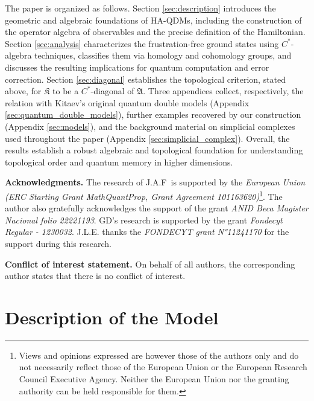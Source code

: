 \documentclass[a4paper,12pt,twoside,reqno]{amsart}
\theoremstyle{plain}
\theoremstyle{definition}
\theoremstyle{remark}
\numberwithin{equation}{section}
\numberwithin{figure}{section}
\numberwithin{table}{section}
\begin{document}
	The paper is organized as follows. Section \ref{sec:description} introduces the geometric and algebraic foundations of HA-QDMs, including the construction of the operator algebra of observables and the precise definition of the Hamiltonian. Section \ref{sec:analysis} characterizes the frustration-free ground states using $C^*$-algebra techniques, classifies them via homology and cohomology groups, and discusses the resulting implications for quantum computation and error correction. Section \ref{sec:diagonal} establishes the topological criterion, stated above, for $\mathfrak{K}$ to be a $C^*$-diagonal of $\mathfrak{A}$. Three appendices collect, respectively, the relation with Kitaev's original quantum double models (Appendix \ref{sec:quantum_double_models}), further examples recovered by our construction (Appendix \ref{sec:models}), and the background material on simplicial complexes used throughout the paper (Appendix \ref{sec:simplicial_complex}). Overall, the results establish a robust algebraic and topological foundation for understanding topological order and quantum memory in higher dimensions.
	
	
	
	\medskip
	
	\noindent
	{\bf Acknowledgments.} The research of J.A.F is supported by the \emph{European Union (ERC Starting Grant MathQuantProp, Grant Agreement 101163620)}\footnote{Views and opinions expressed are however those of the authors only and do not necessarily reflect those of the European Union or the European Research Council Executive Agency. Neither the European Union nor the granting authority can be held responsible for them.}. The author also gratefully acknowledges the support of the grant \emph{ANID Beca Magister Nacional folio 22221193}.
	GD's research is supported by the grant \emph{Fondecyt Regular - 1230032}. J.L.E. thanks the \emph{FONDECYT grant N°11241170} for the support during this research.
	
	
	
	
	\medskip
	\noindent
	{\bf Conflict of interest statement.} On behalf of all authors, the corresponding author states that there is no conflict of interest.
	
	
	
	\section{\label{sec:description}Description of the Model }
	
	
	
\end{document}
